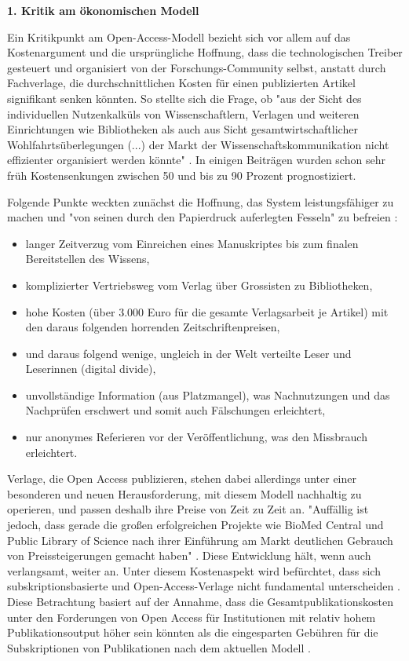 \textbf{1. Kritik am ökonomischen Modell}

Ein Kritikpunkt am Open-Access-Modell bezieht sich vor allem auf das Kostenargument und die ursprüngliche Hoffnung, dass die technologischen Treiber gesteuert und organisiert von der Forschungs-Community selbst, anstatt durch Fachverlage, die durchschnittlichen Kosten für einen publizierten Artikel signifikant senken könnten. So stellte sich die Frage, ob "aus der Sicht des individuellen Nutzenkalküls von Wissenschaftlern, Verlagen und weiteren Einrichtungen wie Bibliotheken als auch aus Sicht gesamtwirtschaftlicher Wohlfahrtsüberlegungen (...) der Markt der Wissenschaftskommunikation nicht effizienter organisiert werden könnte" \cite{Hess_2006}. In einigen Beiträgen wurden schon sehr früh Kostensenkungen zwischen 50 und bis zu 90 Prozent \cite{hilf_2004} \cite[:64]{cite:5} prognostiziert.

Folgende Punkte weckten zunächst die Hoffnung, das System leistungsfähiger zu machen und "von seinen durch den Papierdruck auferlegten Fesseln" zu befreien \cite{hilf_2004}:
\begin{itemize}
\item langer Zeitverzug vom Einreichen eines Manuskriptes bis zum finalen Bereitstellen des Wissens,
\item komplizierter Vertriebsweg vom Verlag über Grossisten zu Bibliotheken,
\item hohe Kosten (über 3.000 Euro für die gesamte Verlagsarbeit je Artikel) mit den daraus folgenden horrenden Zeitschriftenpreisen,
\item und daraus folgend wenige, ungleich in der Welt verteilte Leser und Leserinnen (digital divide),
\item unvollständige Information (aus Platzmangel), was Nachnutzungen und das Nachprüfen erschwert und somit auch Fälschungen erleichtert,
\item nur anonymes Referieren vor der Veröffentlichung, was den Missbrauch erleichtert.
\end{itemize}

Verlage, die Open Access publizieren, stehen dabei allerdings unter einer besonderen und neuen Herausforderung, mit diesem Modell nachhaltig zu operieren, und passen deshalb ihre Preise von Zeit zu Zeit an. "Auffällig ist jedoch, dass gerade die großen erfolgreichen Projekte wie BioMed Central und Public Library of Science nach ihrer Einführung am Markt deutlichen Gebrauch von Preissteigerungen gemacht haben" \cite{schmidt_2007_goldenen}. Diese Entwicklung hält, wenn auch verlangsamt, weiter an. Unter diesem Kostenaspekt wird befürchtet, dass sich subskriptionsbasierte und Open-Access-Verlage nicht fundamental unterscheiden \cite{schmidt_2007_goldenen}. Diese Betrachtung basiert auf der Annahme, dass die Gesamtpublikationskosten unter den Forderungen von Open Access für Institutionen mit relativ hohem Publikationsoutput höher sein könnten als die eingesparten Gebühren für die Subskriptionen von Publikationen nach dem aktuellen Modell \cite{mueller-langer_2010}.

